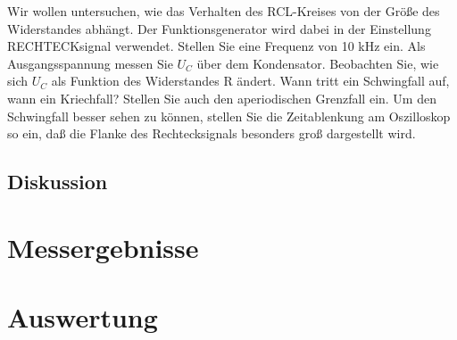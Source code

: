 \documentclass[12pt]{scrartcl}
\begin{document}
Wir wollen untersuchen, wie das Verhalten des RCL-Kreises von der Größe des Widerstandes abhängt. Der Funktionsgenerator wird dabei in der Einstellung RECHTECKsignal verwendet. Stellen Sie eine Frequenz von 10 kHz ein. Als Ausgangsspannung messen Sie
$U_C$ über dem Kondensator. Beobachten Sie, wie sich $U_C$
als Funktion des Widerstandes
R ändert. Wann tritt ein Schwingfall auf, wann ein Kriechfall? Stellen Sie auch den
aperiodischen Grenzfall ein. Um den Schwingfall besser sehen zu können, stellen Sie die Zeitablenkung am Oszilloskop so ein, daß die Flanke des Rechtecksignals besonders groß dargestellt wird.
\subsection{Diskussion}
 
\section{Messergebnisse}



\section{Auswertung}
\end{document}
